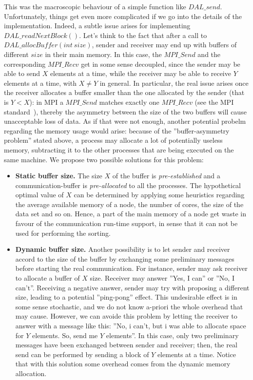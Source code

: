 This was the macroscopic behaviour of a simple function like $DAL\_send$. Unfortunately, things get even more complicated if we go into the details of the implementation. Indeed, a subtle issue arises for implementing $DAL\_readNextBlock( )$. Let's think to the fact that after a call to $DAL\_allocBuffer( int\ size )$, sender and receiver may end up with buffers of different $size$ in their main memory. In this case, the $MPI\_Send$ and the corresponding $MPI\_Recv$ get in some sense decoupled, since the sender may be able to send $X$ elements at a time, while the receiver may be able to receive $Y$ elements at a time, with $X \neq Y$ in general. In particular, the real issue arises once the receiver allocates a buffer smaller than the one allocated by the sender (that is $Y < X$): in MPI a $MPI\_Send$ matches exactly one $MPI\_Recv$ (see the MPI standard~\cite{MPI}), thereby the asymmetry between the size of the two buffers will cause unacceptable loss of data. As if that were not enough, another potential probelm regarding the memory usage would arise: because of the ''buffer-asymmetry problem'' stated above, a process may allocate a lot of potentially useless memory, subtracting it to the other processes that are being executed on the same machine. We propose two possible solutions for this problem: 
\begin{itemize}
\item \textbf{Static buffer size.} The size $X$ of the buffer is \textit{pre-established} and a communication-buffer is \textit{pre-allocated} to all the processes. The hypothetical optimal value of $X$ can be determined by applying some heuristics regarding the average available memory of a node, the number of cores, the size of the data set and so on. Hence, a part of the main memory of a node get waste in favour of the communication run-time support, in sense that it can not be used for performing the sorting. 
\item \textbf{Dynamic buffer size.} Another possibility is to let sender and receiver accord to the size of the buffer by exchanging some preliminary messages before starting the real communication. For instance, sender may ask receiver to allocate a buffer of $X$ size. Receiver may answer ''Yes, I can'' or ''No, I can't''. Receiving a negative answer, sender may try with proposing a different size, leading to a potential ''ping-pong'' effect. This undesirable effect is in some sense stochastic, and we do not know a-priori the whole overhead that may cause. However, we can avoide this problem by letting the receiver to answer with a message like this: ''No, i can't, but i was able to allocate space for $Y$ elements. So, send me $Y$ elements''. In this case, only two preliminary messages have been exchanged between sender and receiver; then, the real send can be performed by sending a block of $Y$ elements at a time. Notice that with this solution some overhead comes from the dynamic memory allocation. 
\end{itemize}
